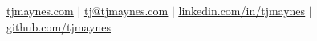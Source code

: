 \begin{center}
  \href{https://tjmaynes.com}{\underline{tjmaynes.com}} $|$
  \href{mailto:tj@tjmaynes.com}{\underline{tj@tjmaynes.com}} $|$
  \href{https://linkedin.com/in/tjmaynes}{\underline{linkedin.com/in/tjmaynes}} $|$
  \href{https://github.com/tjmaynes}{\underline{github.com/tjmaynes}}
\end{center}
